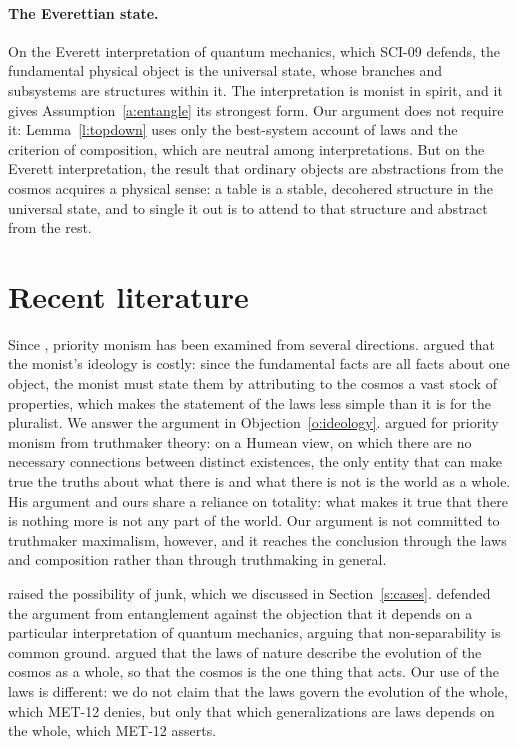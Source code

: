 \documentclass{situationist-preprint}
\begin{document}
\paragraph{The Everettian state.} On the Everett interpretation of quantum mechanics, which SCI-09 defends, the fundamental physical object is the universal state, whose branches and subsystems are structures within it. The interpretation is monist in spirit, and it gives Assumption~\ref{a:entangle} its strongest form. Our argument does not require it: Lemma~\ref{l:topdown} uses only the best-system account of laws and the criterion of composition, which are neutral among interpretations. But on the Everett interpretation, the result that ordinary objects are abstractions from the cosmos acquires a physical sense: a table is a stable, decohered structure in the universal state, and to single it out is to attend to that structure and abstract from the rest.

\section{Recent literature}\label{s:literature}

Since \citet{Schaffer2010}, priority monism has been examined from several directions. \citet{Sider2007} argued that the monist's ideology is costly: since the fundamental facts are all facts about one object, the monist must state them by attributing to the cosmos a vast stock of properties, which makes the statement of the laws less simple than it is for the pluralist. We answer the argument in Objection~\ref{o:ideology}. \citet{Cameron2010} argued for priority monism from truthmaker theory: on a Humean view, on which there are no necessary connections between distinct existences, the only entity that can make true the truths about what there is and what there is not is the world as a whole. His argument and ours share a reliance on totality: what makes it true that there is nothing more is not any part of the world. Our argument is not committed to truthmaker maximalism, however, and it reaches the conclusion through the laws and composition rather than through truthmaking in general.

\citet{Bohn2009} raised the possibility of junk, which we discussed in Section~\ref{s:cases}. \citet{IsmaelSchaffer2020} defended the argument from entanglement against the objection that it depends on a particular interpretation of quantum mechanics, arguing that non-separability is common ground. \citet{Schaffer2013} argued that the laws of nature describe the evolution of the cosmos as a whole, so that the cosmos is the one thing that acts. Our use of the laws is different: we do not claim that the laws govern the evolution of the whole, which MET-12 denies, but only that which generalizations are laws depends on the whole, which MET-12 asserts.
\end{document}
